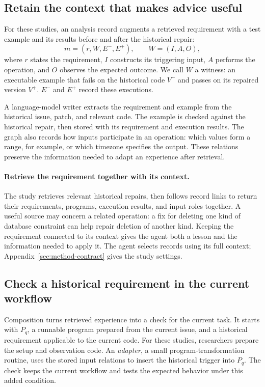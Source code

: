 \subsection{Retain the context that makes advice useful}\label{sec:store}
For these studies, an analysis record augments a retrieved requirement with
a test example and its results before and after the historical repair:
\begin{equation}
 m=(r,W,E^{-},E^{+}),\qquad W=(I,A,O),
 \label{eq:witness}
\end{equation}
where $r$ states the requirement, $I$ constructs its triggering input, $A$
performs the operation, and $O$ observes the expected outcome. We call $W$
a witness: an executable example that fails on the historical code $V^{-}$
and passes on its repaired version $V^{+}$. $E^{-}$ and $E^{+}$ record these executions.

A language-model writer extracts the requirement and example from the
historical issue, patch, and relevant code. The example is checked against
the historical repair, then stored with its requirement and execution results.
The graph also records how inputs participate in an operation: which values
form a range, for example, or which timezone specifies the output. These
relations preserve the information needed to adapt an experience after retrieval.

\paragraph{Retrieve the requirement together with its context.}
The study retrieves relevant historical repairs, then follows record links
to return their requirements, programs, execution results, and input roles
together. A useful source may concern a related operation: a fix for deleting
one kind of database constraint can help repair deletion of another kind.
Keeping the requirement connected to its context gives the agent both a
lesson and the information needed to apply it. The agent selects records using its full context;
Appendix~\ref{sec:method-contract} gives the study settings.

\subsection{Check a historical requirement in the current workflow}
\label{sec:compose}
Composition turns retrieved experience into a check for the current task.
It starts with $P_q$, a runnable program prepared from the current issue,
and a historical requirement applicable to the current code. For these
studies, researchers prepare the setup and observation code. An
\emph{adapter}, a small program-transformation routine, uses the stored input
relations to insert the historical trigger into $P_q$. The check keeps the
current workflow and tests the expected behavior under this added condition.

